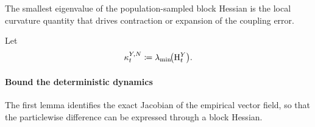 The smallest eigenvalue of the population-sampled block Hessian is the local curvature quantity that drives contraction or expansion of the coupling error.

Let
\begin{equation}
    \kappa_t^{Y,N}
    \coloneq
    \lambda_{\min}\!\bigl(\mathrm{H}_t^{Y}\bigr).
\end{equation}

\paragraph{Bound the deterministic dynamics}

The first lemma identifies the exact Jacobian of the empirical vector field, so that the particlewise difference can be expressed through a block Hessian.

